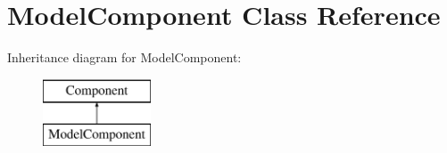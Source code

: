 \hypertarget{class_model_component}{}\section{Model\+Component Class Reference}
\label{class_model_component}
Inheritance diagram for Model\+Component\+:\begin{figure}[H]
\begin{center}
\leavevmode
\includegraphics[height=2.000000cm]{class_model_component}
\end{center}
\end{figure}
